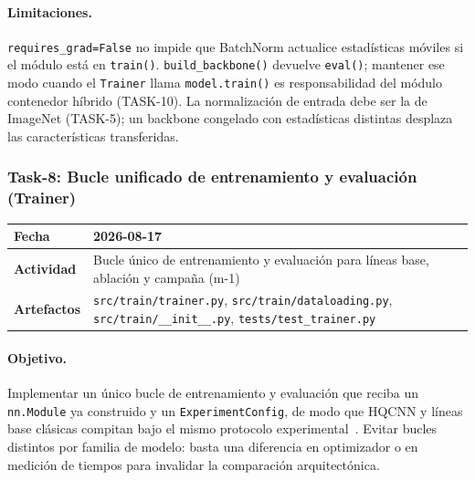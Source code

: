 \paragraph{Limitaciones.}
\texttt{requires\_grad=False} no impide que BatchNorm actualice estadísticas móviles si el
módulo está en \texttt{train()}. \texttt{build\_backbone()} devuelve \texttt{eval()}; mantener
ese modo cuando el \texttt{Trainer} llama \texttt{model.train()} es responsabilidad del
módulo contenedor híbrido (TASK-10). La normalización de entrada debe ser la de ImageNet
(TASK-5); un backbone congelado con estadísticas distintas desplaza las características
transferidas.

\subsubsection{Task-8: Bucle unificado de entrenamiento y evaluación (Trainer)}
\label{hallazgo:task-8}
\begin{tabularx}{\textwidth}{|l|X|}\hline
\textbf{Fecha} & 2026-08-17 \\\hline
\textbf{Actividad} & Bucle único de entrenamiento y evaluación para líneas base, ablación y campaña (m-1) \\\hline
\textbf{Artefactos} & \texttt{src/train/trainer.py}, \texttt{src/train/dataloading.py}, \texttt{src/train/\_\_init\_\_.py}, \texttt{tests/test\_trainer.py} \\\hline
\end{tabularx}

\paragraph{Objetivo.}
Implementar un único bucle de entrenamiento y evaluación que reciba un \texttt{nn.Module}
ya construido y un \texttt{ExperimentConfig}, de modo que HQCNN y líneas base clásicas
compitan bajo el mismo protocolo experimental~\cite{esteva2019guide,litjens2017survey}.
Evitar bucles distintos por familia de modelo: basta una diferencia en optimizador o en
medición de tiempos para invalidar la comparación arquitectónica.

